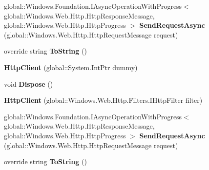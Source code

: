 \begin{DoxyCompactItemize}
\mbox{\label{class_windows_1_1_web_1_1_http_1_1_http_client_ad31279b417a187b8f8f2ec9bfc0149f9}} 
global\+::\+Windows.\+Foundation.\+I\+Async\+Operation\+With\+Progress$<$ global\+::\+Windows.\+Web.\+Http.\+Http\+Response\+Message, global\+::\+Windows.\+Web.\+Http.\+Http\+Progress $>$ {\bfseries Send\+Request\+Async} (global\+::\+Windows.\+Web.\+Http.\+Http\+Request\+Message request)
\item 
\mbox{\label{class_windows_1_1_web_1_1_http_1_1_http_client_a649e21fae58b67e6dcf87c4f4c7fd711}} 
override string {\bfseries To\+String} ()
\item 
\mbox{\label{class_windows_1_1_web_1_1_http_1_1_http_client_a375894a36751ce007d8632850ca5b413}} 
{\bfseries Http\+Client} (global\+::\+System.\+Int\+Ptr dummy)
\item 
\mbox{\label{class_windows_1_1_web_1_1_http_1_1_http_client_aab5624a2c68e0b7e0a4fc8ae1ad2e18a}} 
void {\bfseries Dispose} ()
\item 
\mbox{\label{class_windows_1_1_web_1_1_http_1_1_http_client_a3031f91618b3dbcdb1053a2566067297}} 
{\bfseries Http\+Client} (global\+::\+Windows.\+Web.\+Http.\+Filters.\+I\+Http\+Filter filter)
\item 
\mbox{\label{class_windows_1_1_web_1_1_http_1_1_http_client_ad31279b417a187b8f8f2ec9bfc0149f9}} 
global\+::\+Windows.\+Foundation.\+I\+Async\+Operation\+With\+Progress$<$ global\+::\+Windows.\+Web.\+Http.\+Http\+Response\+Message, global\+::\+Windows.\+Web.\+Http.\+Http\+Progress $>$ {\bfseries Send\+Request\+Async} (global\+::\+Windows.\+Web.\+Http.\+Http\+Request\+Message request)
\item 
\mbox{\label{class_windows_1_1_web_1_1_http_1_1_http_client_a649e21fae58b67e6dcf87c4f4c7fd711}} 
override string {\bfseries To\+String} ()
\item 
\mbox{\label{class_windows_1_1_web_1_1_http_1_1_http_client_a375894a36751ce007d8632850ca5b413}} 

\end{DoxyCompactItemize}
